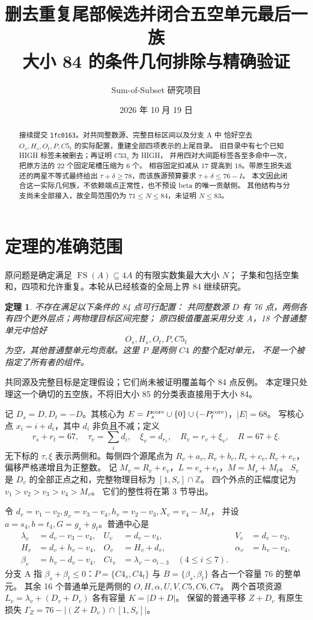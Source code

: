 \documentclass[11pt,a4paper]{article}
\title{删去重复尾部候选并闭合五空单元最后一族\\\large 大小 84 的条件几何排除与精确验证}
\author{Sum-of-Subset 研究项目}
\date{2026 年 10 月 19 日}
\newcommand{\Z}{\mathbb Z}
\newtheorem{theorem}{定理}[section]
\begin{document}
\maketitle
\begin{abstract}
接续提交 \texttt{1fc0163}。对共同整数源、完整目标区间以及分支 A 中
恰好空去 $O_s,H_s,O_t,P,C5_t$ 的实际配置，重建全部四项表示的上尾目录。
旧目录中有七个已知 HIGH 标签未被删去；再证明 $C33_s$ 为 HIGH，
并用四对大间距标签各至多命中一次，把原方法的 22 个固定尾槽压缩为 6 个。
相容固定扣减从 17 提高到 18。带原生损失返还的两星不等式最终给出
$\tau+\delta\ge78$，而该族源预算要求 $\tau+\delta\le76-I$。
本文因此闭合这一实际几何族，不依赖端点正常性，也不预设 beta 的唯一贡献侧。
其他结构与分支尚未全部接入，故全局范围仍为 $71\le N\le84$，未证明 $N\le83$。
\end{abstract}

\section{定理的准确范围}
原问题是确定满足 $\operatorname{FS}(A)\subseteq4A$ 的有限实数集最大大小 $N$；
子集和包括空集和，四项和允许重复。本轮从已经核查的全局上界 84 继续研究。
\begin{theorem}\label{thm:main}
不存在满足以下条件的 84 点可行配置：
共同整数源 $D$ 有 76 点，两侧各有四个更外层点；两物理目标区间完整；
原四极值覆盖采用分支 A，18 个普通整单元中恰好
\[\boxed{O_s,H_s,O_t,P,C5_t}\]
为空，其他普通整单元均贡献。这里 $P$ 是两侧 $C4$ 的整个配对单元，
不是一个被指定了所有者的组件。
\end{theorem}
共同源及完整目标是定理假设；它们尚未被证明覆盖每个 84 点反例。
本定理只处理这一个确切的五空族，不将旧大小 85 的分类表直接用于大小 84。

记 $D_s=D,D_t=-D$。其核心为
$E=P_s^{\rm core}\cup\{0\}\cup(-P_t^{\rm core})$，$|E|=68$。
写核心点 $x_i=i+d_i$，其中 $d_i$ 非负且不减；定义
\[
r_s+r_t=67,\quad \tau_v=\sum_i d_i,\quad\xi_v=d_{r_v},\quad
R_v=r_v+\xi_v,\quad R=67+\xi.
\]
无下标的 $\tau,\xi$ 表示两侧和。每侧四个源尾点为
$R_v+a_v,R_v+b_v,R_v+c_v,R_v+e_v$，偏移严格递增且为正整数。
记 $M_v=R_v+e_v$，$L=e_s+e_t$，$M=M_s+M_t$。
$S_v$ 是 $D_v$ 的全部正点之和，完整物理目标为 $[1,S_v]\cap\Z$。
四个外点的正幅度记为 $v_1>v_2>v_3>v_4>M_v$。
它们的整性将在第 3 节导出。

令 $d_v=v_1-v_2,g_v=v_3-v_4,h_v=v_2-v_3,X_v=v_4-M_v$，
并设 $a=s_4,b=t_4,G=g_s+g_t$。普通中心是
\begin{align*}
\lambda_v&=d_v-v_3-v_4,& U_v&=d_v-v_4,& V_v&=d_v-v_3,\\
H_v&=d_v+h_v-v_4,&O_v&=H_v+d_v,&\alpha_v&=h_v-v_4,\\
\beta_v&=h_v-d_v-v_4,& C i_v&=\lambda_v-o_{i-3}\quad(4\le i\le7).
\end{align*}
分支 A 指 $\beta_s+\beta_t\le0$：$P=\{C4_s,C4_t\}$ 与
$B=\{\beta_s,\beta_t\}$ 各占一个容量 76 的整单元。
其余 16 个普通单元是两侧的 $O,H,\alpha,U,V,C5,C6,C7$。
两个首项资源 $L_v=\lambda_v+(D_v+D_v)$ 各有容量 $K=|D+D|$。
保留的普通平移 $Z+D_v$ 有原生损失
$\Gamma_Z=76-| (Z+D_v)\cap[1,S_v]|$。
\end{document}

